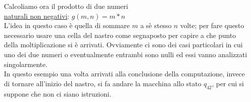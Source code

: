 \begin{esempio}[Prodotto]
Calcoliamo ora il prodotto di due numeri\\ \underline{naturali non
  negativi}: $g(m,n) = m * n$\\

L'idea in questo caso \`e quella di sommare $m$ a s\`e stesso $n$
volte; per fare questo necessario usare una cella del nastro come
segnaposto per capire a che punto della moltiplicazione si \`e
arrivati. Ovviamente ci sono dei casi particolari in cui uno dei due
numeri o eventualmente entrambi sono nulli ed essi vanno analizzati
singolarmente.\\

In questo esempio una volta arrivati alla conclusione della
computazione, invece di tornare all'inizio del nastro, si fa andare la
macchina allo stato $q_{42}$, per cui si suppone che non ci siano
istruzioni.\\


\end{esempio}
